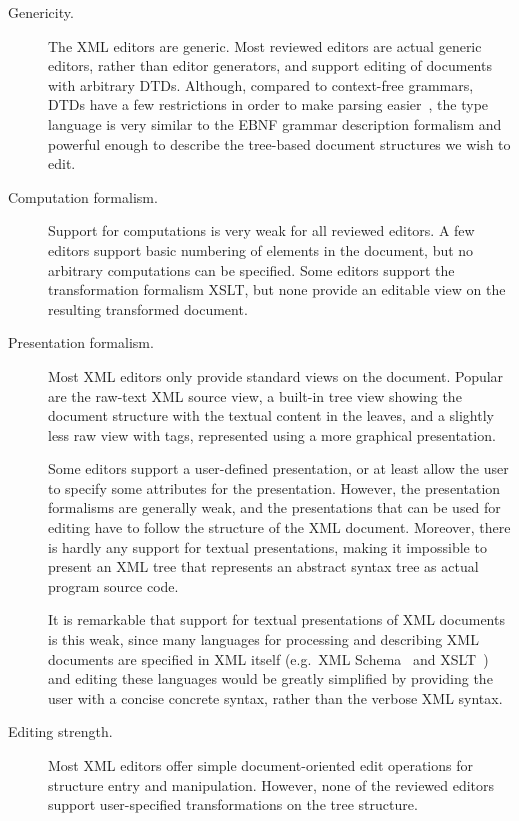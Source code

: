 \begin{description}
\item[Genericity.] 
The XML editors are generic. Most reviewed editors are actual generic editors, rather than editor generators, and support editing of documents with arbitrary DTDs. Although, compared to context-free grammars, DTDs have a few restrictions in order to make parsing easier~\cite{klein98glushkovRestr}, the type language is very similar to the EBNF grammar description formalism and powerful enough to describe the tree-based document structures we wish to edit.

\item[Computation formalism.]
Support for computations is very weak for all reviewed editors. A few editors support basic numbering of elements in the document, but no arbitrary computations can be specified. Some editors support the transformation formalism XSLT, but none provide an editable view on the resulting transformed document.

\item[Presentation formalism.]
Most XML editors only provide standard views on the document. Popular are the raw-text XML source view, a built-in tree view showing the document structure with the textual content in the leaves, and a slightly less raw view with tags, represented using a more graphical presentation.

Some editors support a user-defined presentation, or at least allow the user to specify some attributes for the presentation. However, the presentation formalisms are generally weak, and the presentations that can be used for editing have to follow the structure of the XML document. Moreover, there is hardly any support for textual presentations, making it impossible to present an XML tree that represents an abstract syntax tree as actual program source code.

It is remarkable that support for textual presentations of XML documents is this weak, since many languages for processing and describing XML documents are specified in XML itself (e.g.\ XML Schema~\cite{xmlSchema1, xmlSchema2}  and XSLT~\cite{xslt10}) and editing these languages would be greatly simplified by providing the user with a concise concrete syntax, rather than the verbose XML syntax.

\item[Editing strength.]
Most XML editors offer simple document-oriented edit operations for structure entry and manipulation. However, none of the reviewed editors support user-specified transformations on the tree structure.


\end{description}
